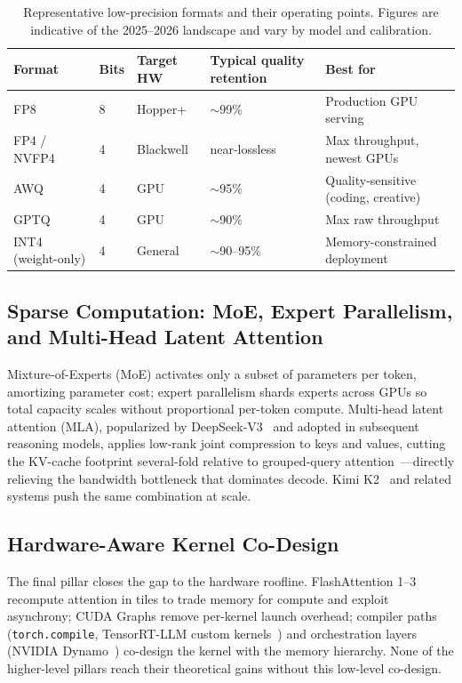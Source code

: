 \documentclass[11pt]{article}
\begin{document}
\begin{table}[t]
\centering
\caption{Representative low-precision formats and their operating points. Figures are indicative of the
2025--2026 landscape and vary by model and calibration.}
\label{tab:quant}
\small
\begin{tabularx}{\textwidth}{@{}lllp{3.2cm}Y@{}}
\toprule
\textbf{Format} & \textbf{Bits} & \textbf{Target HW} & \textbf{Typical quality retention} & \textbf{Best for}\\
\midrule
FP8 & 8 & Hopper+ & $\sim$99\% & Production GPU serving\\
FP4 / NVFP4 & 4 & Blackwell & near-lossless & Max throughput, newest GPUs\\
AWQ & 4 & GPU & $\sim$95\% & Quality-sensitive (coding, creative)\\
GPTQ & 4 & GPU & $\sim$90\% & Max raw throughput\\
INT4 (weight-only) & 4 & General & $\sim$90--95\% & Memory-constrained deployment\\
\bottomrule
\end{tabularx}
\end{table}

\subsection{Sparse Computation: MoE, Expert Parallelism, and Multi-Head Latent Attention}
Mixture-of-Experts (MoE) activates only a subset of parameters per token, amortizing parameter cost; expert
parallelism shards experts across GPUs so total capacity scales without proportional per-token compute.
Multi-head latent attention (MLA), popularized by DeepSeek-V3~\cite{deepseek} and adopted in subsequent
reasoning models, applies low-rank joint compression to keys and values, cutting the KV-cache footprint
several-fold relative to grouped-query attention~\cite{gqa}---directly relieving the bandwidth bottleneck that
dominates decode. Kimi K2~\cite{kimi} and related systems push the same combination at scale.

\subsection{Hardware-Aware Kernel Co-Design}
The final pillar closes the gap to the hardware roofline. FlashAttention 1--3~\cite{flashattn,flashattn2,flashattn3}
recompute attention in tiles to trade memory for compute and exploit asynchrony; CUDA Graphs remove per-kernel
launch overhead; compiler paths (\texttt{torch.compile}, TensorRT-LLM custom kernels~\cite{trtllm}) and
orchestration layers (NVIDIA Dynamo~\cite{dynamo}) co-design the kernel with the memory hierarchy. None of the
higher-level pillars reach their theoretical gains without this low-level co-design.
\end{document}
